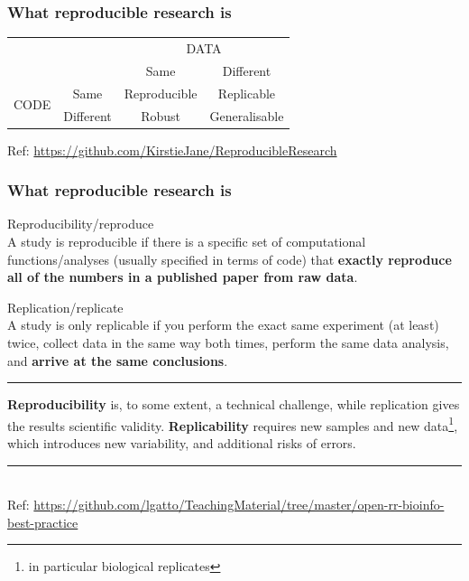 \documentclass{beamer}
\begin{document}
\begin{frame}
\frametitle{What reproducible research is}
\begin{table}[]
\centering
\begin{tabular}{cccc}
                                           &                                & \multicolumn{2}{c}{DATA}                          \\ \cline{3-4}
                                           & \multicolumn{1}{c|}{}          & Same         & \multicolumn{1}{c|}{Different}     \\ \cline{2-4}
\multicolumn{1}{c|}{\multirow{2}{*}{CODE}} & \multicolumn{1}{c|}{Same}      & Reproducible & \multicolumn{1}{c|}{Replicable}    \\
\multicolumn{1}{c|}{}                      & \multicolumn{1}{c|}{Different} & Robust       & \multicolumn{1}{c|}{Generalisable} \\ \cline{2-4}
\end{tabular}
\end{table}
\vspace{3px}
\tiny Ref: {\url{https://github.com/KirstieJane/ReproducibleResearch}}
\end{frame}


\begin{frame}
\frametitle{What reproducible research is}

\Large{Reproducibility/reproduce}\\ \footnotesize A study is reproducible if there is a specific set of computational functions/analyses (usually specified in terms of code) that \textbf{exactly reproduce all of the numbers in a published paper from raw data}.

\Large{Replication/replicate}\\ \footnotesize A study is only replicable if you perform the exact same experiment (at least) twice, collect data in the same way both times, perform the same data analysis, and \textbf{arrive at the same conclusions}.
\rule{\textwidth}{0.05pt}
{\bf Reproducibility} is, to some extent, a technical challenge, while replication gives the results scientific validity. {\bf Replicability} requires new samples and new data\footnote{\tiny{in particular biological replicates}}, which introduces new variability, and additional risks of errors. 
\rule{\textwidth}{0.05pt}\\
\vspace{3px}
\tiny Ref: {\url{https://github.com/lgatto/TeachingMaterial/tree/master/open-rr-bioinfo-best-practice}}
\end{frame}
\end{document}

